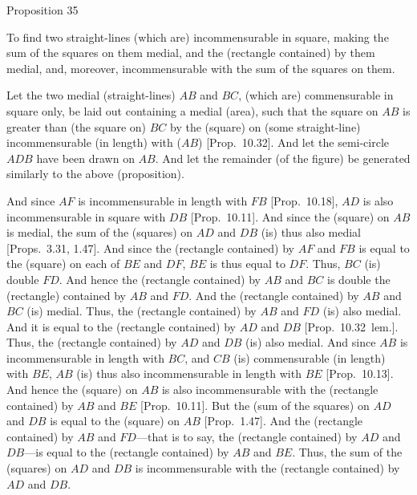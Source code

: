 
\begin{center}
{\large Proposition 35}
\end{center}

To find two straight-lines (which are) incommensurable in square, making the sum of the squares on them medial,
and the (rectangle contained) by them medial, and, moreover,
incommensurable  with the sum of the squares on them.

\centerline{}

Let the two medial (straight-lines) $AB$ and $BC$, (which are) commensurable in square only, be laid out containing a medial (area), such
that the square on $AB$ is greater than (the square on) $BC$ by the
(square) on (some straight-line) incommensurable (in length) with ($AB$) [Prop.~10.32].  And let the semi-circle
$ADB$ have been drawn on $AB$. And let the remainder (of the figure)
be generated similarly to the above (proposition).

And since $AF$ is incommensurable in length with $FB$ [Prop.~10.18], $AD$
is also incommensurable in square with $DB$ [Prop.~10.11]. And since the (square) on $AB$ is
medial, the sum of the (squares) on $AD$ and $DB$ (is) thus also
medial [Props.~3.31, 1.47]. And since the (rectangle
contained) by $AF$ and $FB$ is equal to the (square) on each of $BE$ and
$DF$, $BE$ is thus equal to $DF$. Thus, $BC$ (is) double $FD$. And
hence the (rectangle contained) by $AB$ and $BC$ is double the
(rectangle) contained by $AB$ and $FD$. And the (rectangle contained)
by $AB$ and $BC$ (is) medial. Thus, the (rectangle contained) by $AB$
and $FD$ (is) also medial. And it is equal to the (rectangle contained) 
by $AD$ and $DB$ [Prop.~10.32~lem.]. Thus, the
(rectangle contained) by $AD$ and $DB$ (is) also medial.
And since $AB$ is incommensurable in length with $BC$, and $CB$
(is) commensurable (in length) with $BE$, $AB$ (is) thus also incommensurable
in length with $BE$ [Prop.~10.13]. And hence the (square) on $AB$ is also incommensurable with the (rectangle contained) by $AB$ and $BE$ [Prop.~10.11]. But the (sum of the squares) on $AD$ and
$DB$ is equal to the (square) on $AB$ [Prop.~1.47].
And the (rectangle contained) by $AB$ and $FD$---that is to say, the (rectangle contained) by $AD$ and $DB$---is equal to the
(rectangle contained) by $AB$ and $BE$. Thus, the sum of the (squares) on
$AD$ and $DB$ is incommensurable with the (rectangle contained) by
$AD$ and $DB$.

